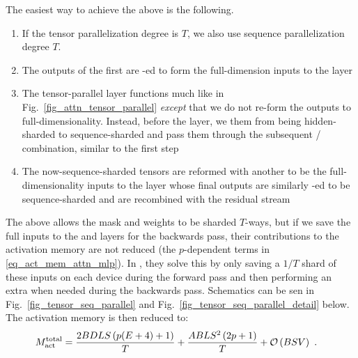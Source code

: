 The easiest way to achieve the above is the following.
\begin{enumerate}
	\item If the tensor parallelization degree is $ T $, we also use sequence parallelization degree $ T
	      $.
	\item The outputs of the first  are -ed to form the full-dimension
	      inputs to the   layer
	\item The tensor-parallel  layer functions much like in
	      Fig.~\ref{fig_attn_tensor_parallel} \textit{except} that we do not re-form the outputs to
	      full-dimensionality.  Instead, before the  layer, we  them
	      from being hidden-sharded to sequence-sharded and pass them through the subsequent
	      / combination, similar to the first step
	\item The now-sequence-sharded tensors are reformed with another  to be the full-dimensionality inputs to the
	       layer whose final outputs are similarly -ed to be
	      sequence-sharded and are recombined with the residual stream
\end{enumerate}
The above allows the  mask and  weights to be sharded $ T
$-ways, but if we save the full inputs to the  and   layers
for the backwards pass, their contributions to the activation memory are not reduced (the $ p
$-dependent terms in \eqref{eq_act_mem_attn_mlp}). In \cite{korthikanti2022reducing}, they solve
this by only saving a $ 1/T $ shard of these inputs on each device during the forward pass and then
performing an extra  when needed during the backwards pass. Schematics can be
sen in Fig.~\ref{fig_tensor_seq_parallel} and Fig.~\ref{fig_tensor_seq_parallel_detail} below. The
activation memory is then reduced to:
\begin{align}
	M _{ {\rm act}  } ^{ {\rm  total}  } & =\frac{ 2BDLS   \left ( p(E+4) + 1   \right ) }{ T }
	+ \frac{ ABLS ^{ 2 } \left ( 2p+1\right ) }{ T }  + \mathcal{O} \left( BSV \right) \label{eq_act_mem_total_seq_parallel}\ .
\end{align}

